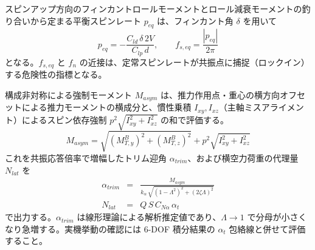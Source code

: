 ﻿\documentclass[a4paper]{jsarticle}
\begin{document}
スピンアップ方向のフィンカントロールモーメントとロール減衰モーメントの釣り合いから定まる平衡スピンレート $p_{eq}$ は、フィンカント角 $\delta$ を用いて
\begin{equation}
p_{eq} = -\frac{C_{ld}\,\delta\,2V}{C_{lp}\,d}, \qquad f_{s,eq} = \frac{|p_{eq}|}{2\pi}
\end{equation}
となる。$f_{s,eq}$ と $f_n$ の近接は、定常スピンレートが共振点に捕捉（ロックイン）する危険性の指標となる。

構成非対称による強制モーメント $M_{asym}$ は、推力作用点・重心の横方向オフセットによる推力モーメントの横成分と、慣性乗積 $I_{xy}, I_{xz}$（主軸ミスアライメント）によるスピン依存強制 $p^2\sqrt{I_{xy}^2 + I_{xz}^2}$ の和で評価する。
\begin{equation}
M_{asym} = \sqrt{(M^B_{T,y})^2 + (M^B_{T,z})^2} + p^2\sqrt{I_{xy}^2 + I_{xz}^2}
\end{equation}
これを共振応答倍率で増幅したトリム迎角 $\alpha_{trim}$、および横空力荷重の代理量 $N_{lat}$ を
\begin{eqnarray}
\alpha_{trim} &=& \frac{M_{asym}}{k_\alpha\,\sqrt{(1 - \Lambda^2)^2 + (2\zeta\Lambda)^2}} \\
N_{lat} &=& Q\,S\,C_{N\alpha}\,\alpha_t
\end{eqnarray}
で出力する。$\alpha_{trim}$ は線形理論による解析推定値であり、$\Lambda \to 1$ で分母が小さくなり急増する。実機挙動の確認には 6-DOF 積分結果の $\alpha_t$ 包絡線と併せて評価すること。
\end{document}

